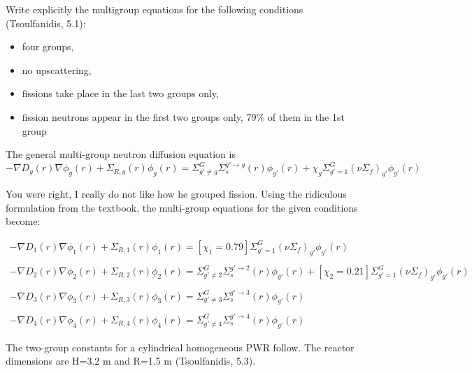 \documentclass[11pt,answers,addpoints]{exam}
\begin{document}
\begin{questions}
        \question[30] Write explicitly the multigroup equations for the 
        following conditions (Tsoulfanidis, 5.1):
        \begin{itemize} 
	\item four groups,
        \item no upscattering,
        \item fissions take place in the last two groups only,
        \item fission neutrons appear in the first two groups only, 79\% of them in the 1st group
\end{itemize}
\begin{solution}

\newcommand{\stream}[1]{- \nabla D_{#1}(r) \nabla \phi_{#1}(r)}
\newcommand{\remove}[1]{\Sigma_{R,{#1}}(r) \phi_{#1}(r)}
\newcommand{\scatter}[1]{\Sigma_{{g'} \neq {#1}}^G \Sigma_s^{{g'} \rightarrow {#1}}(r) \phi_{g'}(r)}
\newcommand{\source}[1]{{#1} \Sigma_{g' = 1}^G \left(\nu \Sigma_f \right)_{g'} \phi_{g'}(r)}

The general multi-group neutron diffusion equation is
\begin{equation}
    \stream{g} + \remove{g} = \scatter{g} + \source{\chi_{g}}
\end{equation}

You were right, I really do not like how he grouped fission. Using the ridiculous formulation from the textbook, the multi-group equations for the given conditions become:

\begin{align*}
\stream{1} + \remove{1} = \source{\left[ \chi_1 = 0.79 \right]}\\\\
\stream{2} + \remove{2} = \scatter{2} + \source{\left[ \chi_2 = 0.21 \right]}\\\\
\stream{3} + \remove{3} = \scatter{3}\\\\
\stream{4} + \remove{4} = \scatter{4}
\end{align*}
\end{solution}

        \question The two-group constants for a cylindrical
homogeneous PWR follow. The reactor dimensions are H=3.2 m and R=1.5 m
(Tsoulfanidis, 5.3).



\end{questions}
\end{document}
